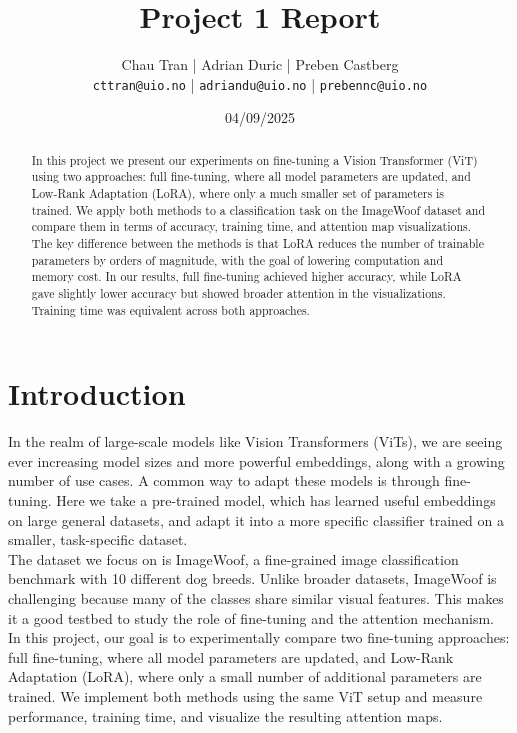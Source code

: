 \documentclass[10pt]{article}
\begin{document}
\title{Project 1 Report}
\author{Chau Tran | Adrian Duric | Preben Castberg\\\footnotesize\texttt{cttran@uio.no} | \texttt{adriandu@uio.no} | \texttt{prebennc@uio.no}}
\date{04/09/2025}
\maketitle

\begin{abstract}
In this project we present our experiments on fine-tuning a Vision Transformer (ViT) using two approaches: full fine-tuning, where all model parameters are updated, and Low-Rank Adaptation (LoRA), where only a much smaller set of parameters is trained. We apply both methods to a classification task on the ImageWoof dataset and compare them in terms of accuracy, training time, and attention map visualizations. The key difference between the methods is that LoRA reduces the number of trainable parameters by orders of magnitude, with the goal of lowering computation and memory cost. In our results, full fine-tuning achieved higher accuracy, while LoRA gave slightly lower accuracy but showed broader attention in the visualizations. Training time was equivalent across both approaches.
\end{abstract}

\section{Introduction}
In the realm of large-scale models like Vision Transformers (ViTs), we are seeing ever increasing model sizes and more powerful embeddings, along with a growing number of use cases. A common way to adapt these models is through fine-tuning. Here we take a pre-trained model, which has learned useful embeddings on large general datasets, and adapt it into a more specific classifier trained on a smaller, task-specific dataset. \\ 

The dataset we focus on is ImageWoof, a fine-grained image classification benchmark with 10 different dog breeds. Unlike broader datasets, ImageWoof is challenging because many of the classes share similar visual features. This makes it a good testbed to study the role of fine-tuning and the attention mechanism.\\ 

In this project, our goal is to experimentally compare two fine-tuning approaches: full fine-tuning, where all model parameters are updated, and Low-Rank Adaptation (LoRA), where only a small number of additional parameters are trained. We implement both methods using the same ViT setup and measure performance, training time, and visualize the resulting attention maps.\\ 
\end{document}
